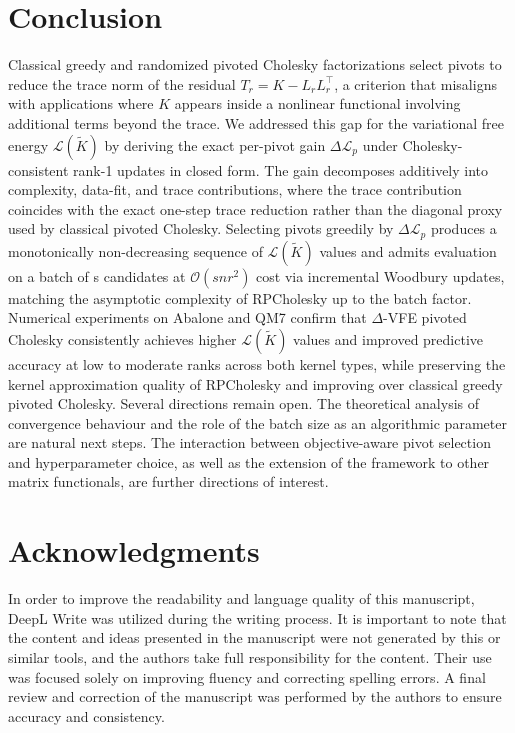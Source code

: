 \documentclass[onefignum,onetabnum]{siamart250211}
\begin{document}
\section{Conclusion}

Classical greedy and randomized pivoted Cholesky factorizations select pivots to reduce the trace norm of the residual $T_r = K - L_r L_r^\top$, a criterion that misaligns with applications where $K$ appears inside a nonlinear functional involving additional terms beyond the trace. We addressed this gap for the variational free energy $\mathcal{L}(\widetilde{K})$ by deriving the exact per-pivot gain $\Delta\mathcal{L}_p$ under Cholesky-consistent rank-1 updates in closed form. The gain decomposes additively into complexity, data-fit, and trace contributions, where the trace contribution coincides with the exact one-step trace reduction rather than the diagonal proxy used by classical pivoted Cholesky. Selecting pivots greedily by $\Delta\mathcal{L}_p$ produces a monotonically non-decreasing sequence of $\mathcal{L}(\widetilde{K})$ values and admits evaluation on a batch of s candidates at $\mathcal{O}(snr^2)$ cost via incremental Woodbury updates, matching the asymptotic complexity of RPCholesky up to the batch factor. Numerical experiments on Abalone and QM7 confirm that $\Delta$-VFE pivoted Cholesky consistently achieves higher $\mathcal{L}(\widetilde{K})$ values and improved predictive accuracy at low to moderate ranks across both kernel types, while preserving the kernel approximation quality of RPCholesky and improving over classical greedy pivoted Cholesky.
Several directions remain open. The theoretical analysis of convergence behaviour and the role of the batch size as an algorithmic parameter are natural next steps. The interaction between objective-aware pivot selection and hyperparameter choice, as well as the extension of the framework to other matrix functionals, are further directions of interest.
\newpage
\newpage
\section*{Acknowledgments}

In order to improve the readability and language quality of this manuscript, DeepL Write was utilized during the writing process. It is important to note that the
content and ideas presented in the manuscript were not generated by this or similar tools, and the authors take full responsibility for the content. Their use was focused solely on improving fluency and correcting spelling errors. A final review and correction of the manuscript was performed by the authors to ensure accuracy and consistency.
%


\appendix
\end{document}
